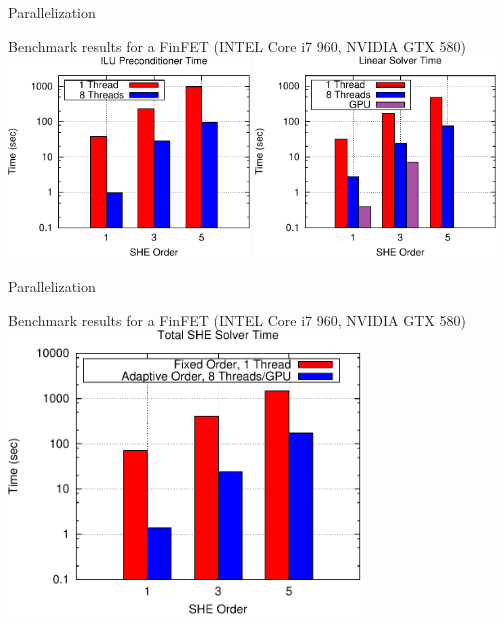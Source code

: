 \documentclass[usepdftitle=false,handout,10pt]{beamer}
\begin{document}
\begin{frame}{Parallelization}
  \vspace{-1.25cm}
  \begin{center}
   Benchmark results for a FinFET (INTEL Core i7 960, NVIDIA GTX 580) \\
   \vspace*{0.5cm}
  \includegraphics[width=0.48\textwidth]{mosfet-precondtimes} \hspace*{0.2cm}
  \includegraphics[width=0.48\textwidth]{mosfet-solvertimes}
  \end{center}
\end{frame}

\begin{frame}{Parallelization}
  \begin{center}
   Benchmark results for a FinFET (INTEL Core i7 960, NVIDIA GTX 580) \\
   \vspace*{0.5cm}
   \includegraphics[width=0.7\textwidth]{mosfet-totaltimes}
  \end{center}
\end{frame}
\end{document}

